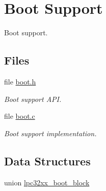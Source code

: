 \hypertarget{group__lpc32xx__boot}{}\section{Boot Support}
\label{group__lpc32xx__boot}


Boot support.  


\subsection*{Files}
\begin{DoxyCompactItemize}
\item 
file \mbox{\hyperlink{arm_2lpc32xx_2include_2bsp_2boot_8h}{boot.\+h}}
\begin{DoxyCompactList}\small\item\em Boot support A\+PI. \end{DoxyCompactList}\item 
file \mbox{\hyperlink{boot_8c}{boot.\+c}}
\begin{DoxyCompactList}\small\item\em Boot support implementation. \end{DoxyCompactList}\end{DoxyCompactItemize}
\subsection*{Data Structures}
\begin{DoxyCompactItemize}
\item 
union \mbox{\hyperlink{unionlpc32xx__boot__block}{lpc32xx\+\_\+boot\+\_\+block}}
\end{DoxyCompactItemize}
